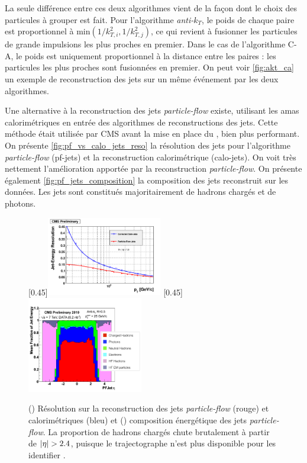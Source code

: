 La seule différence entre ces deux algorithmes vient de la façon dont le choix des particules à grouper est fait. Pour l'algorithme \emph{anti-$k_T$}, le poids de chaque paire est proportionnel à $\text{min}\left( 1 / k^2_{T,i}, 1 / k^2_{T,j} \right)$, ce qui revient à fusionner les particules de grande impulsions les plus proches en premier. Dans le cas de l'algorithme C-A, le poids est uniquement proportionnel à la distance entre les paires : les particules les plus proches sont fusionnées en premier. On peut voir \cref{fig:akt_ca} un exemple de reconstruction des jets sur un même événement par les deux algorithmes.

\bigskip

Une alternative à la reconstruction des jets \emph{particle-flow} existe, utilisant les amas calorimétriques en entrée des algorithmes de reconstructions des jets. Cette méthode était utilisée par CMS avant la mise en place du \pf, bien plus performant. On présente \cref{fig:pf_vs_calo_jets_reso} la résolution des jets pour l'algorithme \emph{particle-flow} (pf-jets) et la reconstruction calorimétrique (calo-jets). On voit très nettement l'amélioration apportée par la reconstruction \emph{particle-flow}. On présente également \cref{fig:pf_jets_composition} la composition des jets \pf reconstruit sur les données. Les jets sont constitués majoritairement de hadrons chargés et de photons.

\begin{figure}[tbp]
    \centering
    \subcaptionbox{\label{fig:pf_vs_calo_jets_reso}}[0.45\textwidth]{\includegraphics[width=0.45\textwidth]{chapitre3/figs/pf_vs_calo_jets.pdf}} \hfill
    \subcaptionbox{\label{fig:pf_jets_composition}}[0.45\textwidth]{\includegraphics[width=0.45\textwidth]{chapitre3/figs/pf_jets_composition.png}}
    \caption{() Résolution sur la reconstruction des jets \emph{particle-flow} (rouge) et calorimétriques (bleu) et () composition énergétique des jets \emph{particle-flow}. La proportion de hadrons chargés chute brutalement à partir de $\lvert \eta \rvert > 2.4$, puisque le trajectographe n'est plus disponible pour les identifier \citep{cms_pf_jets}.}
    \label{fig:pf_jets_perf}
\end{figure}

